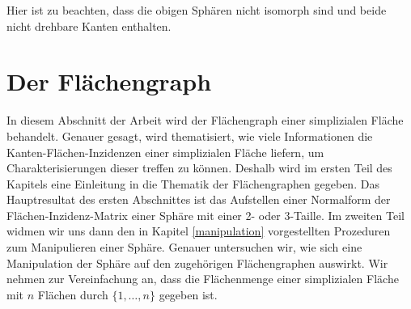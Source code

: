 \documentclass[12pt,titlepage,twoside,cleardoublepage]{article}
\theoremstyle{nummermitklammern}
\numberwithin{equation}{section}
\begin{document}
Hier ist zu beachten, dass die obigen Sphären nicht isomorph sind und beide nicht drehbare Kanten enthalten.
\newpage
\section{Der Flächengraph}
In diesem Abschnitt der Arbeit wird der Flächengraph einer simplizialen Fläche behandelt. Genauer gesagt, wird thematisiert, wie viele Informationen die Kanten-Flächen-Inzidenzen einer simplizialen Fläche liefern, um Charakterisierungen dieser treffen zu können. Deshalb wird im ersten Teil des Kapitels eine Einleitung in die Thematik der Flächengraphen gegeben. Das Hauptresultat des ersten Abschnittes ist das Aufstellen einer Normalform der Flächen-Inzidenz-Matrix einer Sphäre mit einer 2- oder 3-Taille. Im zweiten Teil widmen wir uns dann den in Kapitel \ref{manipulation} vorgestellten Prozeduren zum Manipulieren einer Sphäre. Genauer untersuchen wir, wie sich eine Manipulation der Sphäre auf den zugehörigen Flächengraphen auswirkt.  
Wir nehmen zur Vereinfachung an, dass die Flächenmenge einer simplizialen Fläche mit $n$ Flächen  durch $\{1,\ldots,n\}$ gegeben ist.
\end{document}
